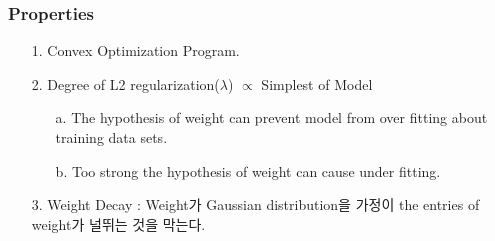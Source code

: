 \documentclass{article}
\begin{document}
\subsubsection{Properties}
\begin{itemize}
    \item [1.] Convex Optimization Program.
    \item [2.] Degree of L2 regularization($\lambda$) $\propto$ Simplest of Model
        \begin{itemize}
            \item[a.] The hypothesis of weight can prevent model from over fitting about training data sets.
            \item[b.] Too strong the hypothesis of weight can cause under fitting.
        \end{itemize}
    \item[3.] Weight Decay : Weight가 Gaussian distribution을 가정이 the entries of weight가 널뛰는 것을 막는다.
\end{itemize}
\end{document}
